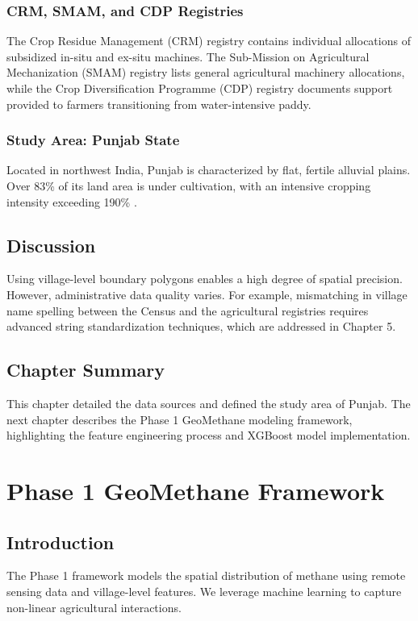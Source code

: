 \documentclass[12pt,a4paper]{report}
\begin{document}
\subsection{CRM, SMAM, and CDP Registries}
The Crop Residue Management (CRM) registry contains individual allocations of subsidized in-situ and ex-situ machines. The Sub-Mission on Agricultural Mechanization (SMAM) registry lists general agricultural machinery allocations, while the Crop Diversification Programme (CDP) registry documents support provided to farmers transitioning from water-intensive paddy.

\subsection{Study Area: Punjab State}
Located in northwest India, Punjab is characterized by flat, fertile alluvial plains. Over 83\% of its land area is under cultivation, with an intensive cropping intensity exceeding 190\% \citep{singh2020paddy}.

\section{Discussion}
Using village-level boundary polygons enables a high degree of spatial precision. However, administrative data quality varies. For example, mismatching in village name spelling between the Census and the agricultural registries requires advanced string standardization techniques, which are addressed in Chapter 5.

\section{Chapter Summary}
This chapter detailed the data sources and defined the study area of Punjab. The next chapter describes the Phase 1 GeoMethane modeling framework, highlighting the feature engineering process and XGBoost model implementation.

\chapter{Phase 1 GeoMethane Framework}
\label{ch:phase1}

\section{Introduction}
The Phase 1 framework models the spatial distribution of methane using remote sensing data and village-level features. We leverage machine learning to capture non-linear agricultural interactions.
\end{document}
